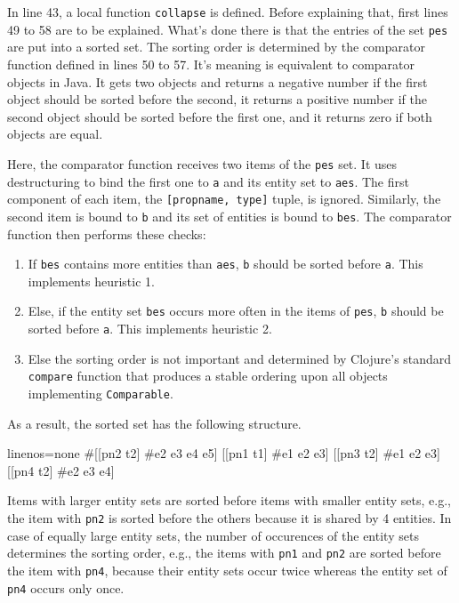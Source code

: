 \documentclass[submission]{eptcs}
\begin{document}
In line 43, a local function \verb|collapse| is defined.  Before explaining
that, first lines 49 to 58 are to be explained.  What's done there is that the
entries of the set \verb|pes| are put into a sorted set.  The sorting order is
determined by the comparator function defined in lines 50 to 57.  It's meaning
is equivalent to comparator objects in Java.  It gets two objects and returns a
negative number if the first object should be sorted before the second, it
returns a positive number if the second object should be sorted before the
first one, and it returns zero if both objects are equal.

Here, the comparator function receives two items of the \verb|pes| set.  It
uses destructuring to bind the first one to \verb|a| and its entity set to
\verb|aes|.  The first component of each item, the \verb|[propname, type]|
tuple, is ignored.  Similarly, the second item is bound to \verb|b| and its set
of entities is bound to \verb|bes|.  The comparator function then performs
these checks:

\begin{enumerate}
\item If \verb|bes| contains more entities than \verb|aes|, \verb|b| should be
  sorted before \verb|a|.  This implements heuristic 1.
\item Else, if the entity set \verb|bes| occurs more often in the items of
  \verb|pes|, \verb|b| should be sorted before \verb|a|.  This implements
  heuristic 2.
\item Else the sorting order is not important and determined by Clojure's
  standard \verb|compare| function that produces a stable ordering upon all
  objects implementing \verb|Comparable|.
\end{enumerate}

As a result, the sorted set has the following structure.

\begin{clojurecode*}{linenos=none}
#{[[pn2 t2] #{e2 e3 e4 e5}]
  [[pn1 t1] #{e1 e2 e3}]
  [[pn3 t2] #{e1 e2 e3}]
  [[pn4 t2] #{e2 e3 e4}]}
\end{clojurecode*}

Items with larger entity sets are sorted before items with smaller entity sets,
e.g., the item with \verb|pn2| is sorted before the others because it is shared
by 4 entities.  In case of equally large entity sets, the number of occurences
of the entity sets determines the sorting order, e.g., the items with
\verb|pn1| and \verb|pn2| are sorted before the item with \verb|pn4|, because
their entity sets occur twice whereas the entity set of \verb|pn4| occurs only
once.
\end{document}
